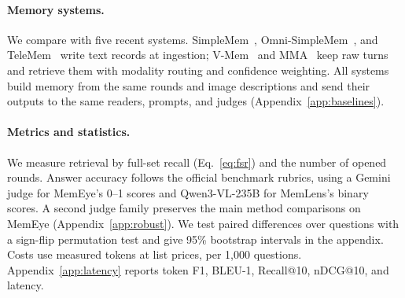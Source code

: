 \paragraph{Memory systems.} We compare with five recent systems. SimpleMem~\citep{liu2026simplemem}, Omni-SimpleMem~\citep{liu2026omnisimplemem}, and TeleMem~\citep{chen2026telemem} write text records at ingestion; V-Mem~\citep{kang2026vmem} and MMA~\citep{lu2026mma} keep raw turns and retrieve them with modality routing and confidence weighting. All systems build memory from the same rounds and image descriptions and send their outputs to the same readers, prompts, and judges (Appendix~\ref{app:baselines}).

\paragraph{Metrics and statistics.} We measure retrieval by full-set recall (Eq.~\ref{eq:fsr}) and the number of opened rounds. Answer accuracy follows the official benchmark rubrics, using a Gemini judge for MemEye's 0--1 scores and Qwen3-VL-235B for MemLens's binary scores. A second judge family preserves the main method comparisons on MemEye (Appendix~\ref{app:robust}). We test paired differences over questions with a sign-flip permutation test and give 95\% bootstrap intervals in the appendix. Costs use measured tokens at list prices, per 1,000 questions. Appendix~\ref{app:latency} reports token F1, BLEU-1, Recall@10, nDCG@10, and latency.
